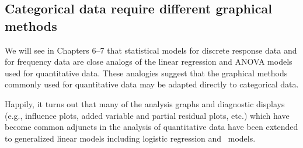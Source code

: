 \subsection{Categorical data require different graphical methods}\label{sec:intro-catdata}

We will see in Chapters 6--7 that statistical models for discrete
response data and for frequency 
data are close analogs of the linear regression and ANOVA models
used for quantitative data.
These analogies suggest that the graphical methods
commonly used for quantitative data may be adapted directly to
categorical data.

Happily, it turns out that many of the analysis graphs and diagnostic
displays (e.g., influence plots, added variable and partial residual
plots, etc.)
which have become common adjuncts in the analysis of
quantitative data have been extended to generalized linear models
including logistic regression and \loglin\ models.

